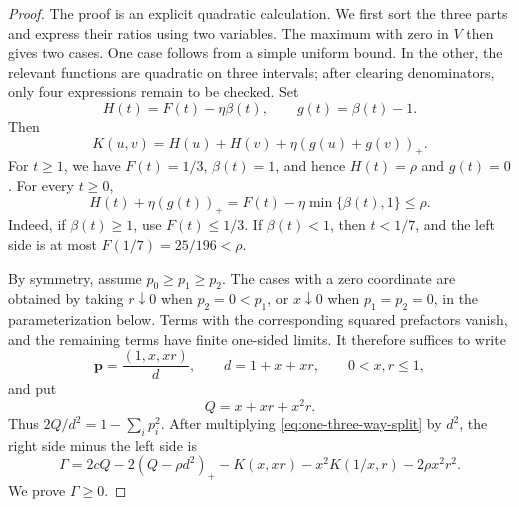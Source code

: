 \documentclass[11pt]{article}
\numberwithin{equation}{section}
\theoremstyle{remark}
\begin{document}
\begin{proof}
The proof is an explicit quadratic calculation.  We first sort the three
parts and express their ratios using two variables.  The maximum with zero in $V$ then gives two cases.  One case follows from a simple uniform bound.  In
the other, the relevant functions are quadratic on three intervals; after
clearing denominators, only four expressions remain to be checked.
Set
\begin{equation}\label{eq:def-H-g}
 H(t)=F(t)-\eta\beta(t),
 \qquad
 g(t)=\beta(t)-1.
\end{equation}
Then
\begin{equation}\label{eq:K-Hg}
 K(u,v)=H(u)+H(v)+\eta(g(u)+g(v))_+.
\end{equation}
For $t\ge1$, we have $F(t)=1/3$, $\beta(t)=1$, and hence
$H(t)=\rho$ and $g(t)=0$.  For every $t\ge0$,
\begin{equation}\label{eq:single-rho}
 H(t)+\eta(g(t))_+
 =F(t)-\eta\min\{\beta(t),1\}\le\rho.
\end{equation}
Indeed, if $\beta(t)\ge1$, use $F(t)\le1/3$.  If $\beta(t)<1$, then
$t<1/7$, and the left side is at most
$F(1/7)=25/196<\rho$.

By symmetry, assume $p_0\ge p_1\ge p_2$.  The cases with a zero coordinate
are obtained by taking $r\downarrow0$ when $p_2=0<p_1$, or
$x\downarrow0$ when $p_1=p_2=0$, in the parameterization below.  Terms with
the corresponding squared prefactors vanish, and the remaining terms have
finite one-sided limits.  It therefore suffices to write
\begin{equation}\label{eq:param-p}
 \mathbf p=\frac{(1,x,xr)}d,
 \qquad d=1+x+xr,
 \qquad 0<x,r\le1,
\end{equation}
and put
\begin{equation}\label{eq:def-Q}
 Q=x+xr+x^2r.
\end{equation}
Thus $2Q/d^2=1-\sum_i p_i^2$.  After multiplying
\eqref{eq:one-three-way-split} by $d^2$, the right side minus the left side is
\begin{equation}\label{eq:def-Gamma}
 \Gamma=2cQ-2(Q-\rho d^2)_+
 -K(x,xr)-x^2K(1/x,r)-2\rho x^2r^2.
\end{equation}
We prove $\Gamma\ge0$.


\end{proof}
\end{document}
